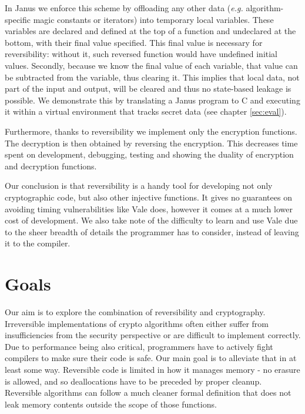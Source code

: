 \documentclass[a4paper,10pt,openright]{memoir}
\newcommand{\eg}{\emph{e.g.}\xspace}
\begin{document}
In Janus we enforce this scheme by offloading any other data (\eg algorithm-specific magic constants or iterators) into 
temporary local variables. These variables are declared and defined at 
the top of a function and undeclared at the bottom, with their final 
value specified. This final value is necessary for reversibility: 
without it, such reversed function would have undefined initial values. 
Secondly, because we know the final value of each variable, that value 
can be subtracted from the variable, thus clearing it. This implies 
that local data, not part of the input and output, will be cleared and 
thus no state-based leakage is possible. We demonstrate this by 
translating a Janus program to C and executing it within a virtual 
environment that tracks secret data (see chapter \ref{sec:eval}).

Furthermore, thanks to reversibility we implement only the encryption 
functions. The decryption is then obtained by reversing the encryption. 
This decreases time spent on development, debugging, testing and 
showing the duality of encryption and decryption functions.

Our conclusion is that reversibility is a handy tool for developing not 
only cryptographic code, but also other injective functions. It gives 
no guarantees on avoiding timing vulnerabilities like Vale does, 
however it comes at a much lower cost of development. We also take note 
of the difficulty to learn and use Vale due to the sheer breadth of 
details the programmer has to consider, instead of leaving it to the 
compiler.









\section{Goals}
\label{sec:goals}

Our aim is to explore the combination of reversibility and 
cryptography. Irreversible implementations of crypto algorithms often 
either suffer from insufficiencies from the security perspective or are 
difficult to implement correctly. Due to performance being also 
critical, programmers have to actively fight compilers to make sure 
their code is safe. Our main goal is to alleviate that in at least some 
way. Reversible code is limited in how it manages memory - no erasure 
is allowed, and so deallocations have to be preceded by proper 
cleanup. Reversible algorithms can follow a much cleaner formal 
definition that does not leak memory contents outside the scope of 
those functions.
\end{document}
